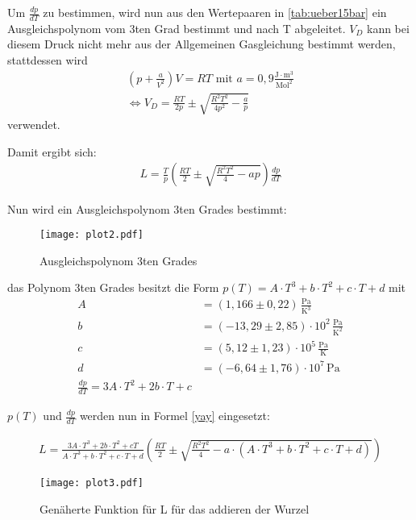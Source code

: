 Um $\frac{dp}{dT}$ zu bestimmen, wird nun aus den Wertepaaren in \autoref{tab:ueber15bar} ein Ausgleichspolynom
vom 3ten Grad bestimmt und nach T abgeleitet. $V_D$ kann bei diesem Druck nicht mehr aus der Allgemeinen Gasgleichung
bestimmt werden, stattdessen wird
\begin{align}
  \left(p+\frac{a}{V^2}\right)V = RT \, \, \mathrm{mit} \, \, a = 0,9 \mathrm{\frac{J \cdot m^3}{Mol^2}} \\
  \Leftrightarrow V_D = \frac{RT}{2p} \pm \sqrt{\frac{R^2T^2}{4p^2}-\frac{a}{p}}
\end{align}
verwendet.

Damit ergibt sich:
\begin{align}
  \label{yay}
  L = \frac{T}{p} \left(\frac{RT}{2} \pm \sqrt{\frac{R^2T^2}{4}-ap}\right)\frac{dp}{dT}
\end{align}

Nun wird ein Ausgleichspolynom 3ten Grades bestimmt:
\begin{figure}
  \centering
  \texttt{[image: plot2.pdf]}
  \caption{Ausgleichspolynom 3ten Grades}
  \label{fig:plot2}
\end{figure}

das Polynom 3ten Grades besitzt die Form $p(T)= A \cdot T^3 + b \cdot T^2 + c \cdot T + d$ mit 
\begin{align*}
  A &= (1,166 \pm 0,22) \, \mathrm{\frac{Pa}{K^3}} \\
  b &= (-13,29 \pm 2,85) \cdot 10^2 \, \mathrm{\frac{Pa}{K^2}}\\
  c &= (5,12 \pm 1,23) \cdot 10^5 \, \mathrm{\frac{Pa}{K}}\\
  d &= (-6,64 \pm 1,76) \cdot 10^7 \, \mathrm{Pa}\\
  \frac{dp}{dT}= 3A \cdot T^2 + 2b \cdot T + c
\end{align*}

$p(T)$ und $\frac{dp}{dT}$ werden nun in Formel \ref{yay} eingesetzt:

\begin{align*}
L = \frac{3A \cdot T^3 + 2b \cdot T^2 + cT}{A \cdot T^3 + b \cdot T^2 + c \cdot T + d} \left(\frac{RT}{2} \pm \sqrt{\frac{R^2T^2}{4}-a\cdot(A \cdot T^3 + b \cdot T^2 + c \cdot T + d)}\right)
\end{align*}

\begin{figure}
  \centering
  \texttt{[image: plot3.pdf]}
  \caption{Genäherte Funktion für L für das addieren der Wurzel}
  \label{fig:plot3}
\end{figure}

